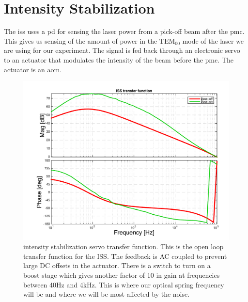 
\section{Intensity Stabilization}


The \ac{iss} uses a \ac{pd} for sensing the laser power from a pick-off
beam after the \ac{pmc}. This gives us sensing of the amount of power in
the $\mathrm{TEM}_{00}$ mode of the laser we are using for our experiment. The signal is
fed back through an electronic servo to an actuator that modulates the
intensity of the beam before the \ac{pmc}. The actuator is an \ac{aom}.


\begin{figure}[htbp]
	\centering
		\includegraphics[width=15cm]{./figures/ISStf.pdf}
	\caption[Intensity Stabilization Servo]{
           intensity stabilization servo transfer function.
           This is the open loop transfer function for the ISS.
           The feedback is AC coupled to prevent large DC offsets in the
           actuator.
           There is a switch to turn on a boost stage which gives another
           factor of 10 in gain at frequencies between 40Hz and 4kHz.
           This is where our optical spring frequency will be and where
           we will be most affected by the noise.
        }
	\label{fig:isstf}
\end{figure}

